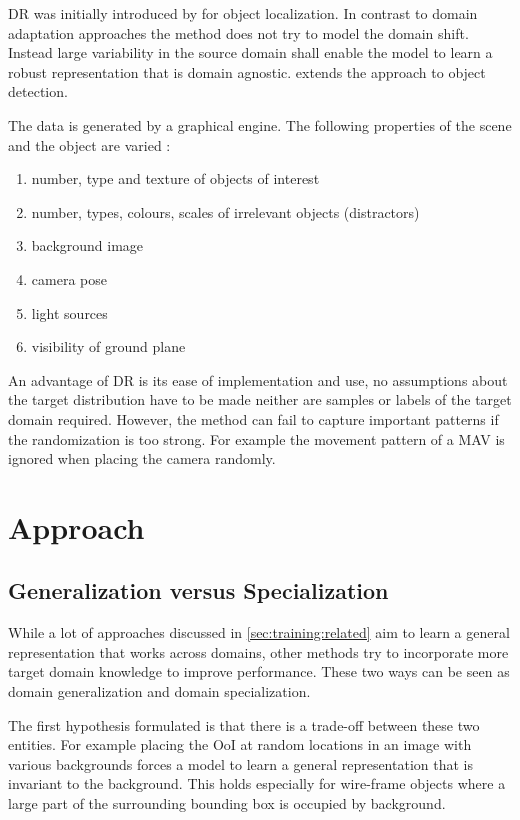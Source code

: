 \ac{DR} was initially introduced by \cite{Tobin2017} for object localization. In contrast to domain adaptation approaches the method does not try to model the domain shift. Instead large variability in the source domain shall enable the model to learn a robust representation that is domain agnostic. \cite{Tremblay2018a} extends the approach to object detection.

The data is generated by a graphical engine. The following properties of the scene and the object are varied \cite{Tremblay2018a}:

\begin{enumerate}
	\item number, type and texture of objects of interest
	\item number, types, colours, scales of irrelevant objects (distractors)
	\item background image
	\item camera pose
	\item light sources
	\item visibility of ground plane
\end{enumerate}

An advantage of \ac{DR} is its ease of implementation and use, no assumptions about the target distribution have to be made neither are samples or labels of the target domain required. However, the method can fail to capture important patterns if the randomization is too strong. For example the movement pattern of a \ac{MAV} is ignored when placing the camera randomly.
 
\section{Approach}
\label{sec:training:hypothesis}

\subsection{Generalization versus Specialization}

While a lot of approaches discussed in \autoref{sec:training:related} aim to learn a general representation that works across domains, other methods try to incorporate more target domain knowledge to improve performance. These two ways can be seen as domain generalization and domain specialization.

The first hypothesis formulated is that there is a trade-off between these two entities. For example placing the \ac{OoI} at random locations in an image with various backgrounds forces a model to learn a general representation that is invariant to the background. This holds especially for wire-frame objects where a large part of the surrounding bounding box is occupied by background.

